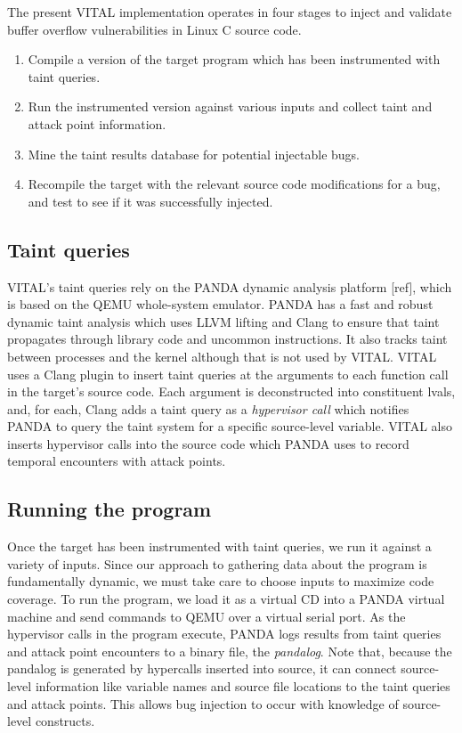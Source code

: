 
The present VITAL implementation operates in four stages to inject and validate buffer overflow vulnerabilities in Linux C source code. 

\begin{enumerate}
\item Compile a version of the target program which has been instrumented with taint queries.
\item Run the instrumented version against various inputs and collect taint and attack point information.
\item Mine the taint results database for potential injectable bugs.
\item Recompile the target with the relevant source code modifications for a bug, and test to see if it was successfully injected.
\end{enumerate}

\subsection{Taint queries}
VITAL's taint queries rely on the PANDA dynamic analysis platform [ref], which is based on the QEMU whole-system emulator.
PANDA has a fast and robust dynamic taint analysis which uses LLVM lifting and Clang to ensure that taint propagates through library code and uncommon instructions.
It also tracks taint between processes and the kernel although that is not used by VITAL.
VITAL uses a Clang plugin to insert taint queries at the arguments to each function call in the target's source code.
Each argument is deconstructed into constituent lvals, and, for each, Clang adds a taint query as a \emph{hypervisor call} which notifies PANDA to query the taint system for a specific source-level variable.
VITAL also inserts hypervisor calls into the source code which PANDA uses to record temporal encounters with attack points.

\subsection{Running the program}
Once the target has been instrumented with taint queries, we run it against a variety of inputs.
Since our approach to gathering data about the program is fundamentally dynamic, we must take care to choose inputs to maximize code coverage.
To run the program, we load it as a virtual CD into a PANDA virtual machine and send commands to QEMU over a virtual serial port.
As the hypervisor calls in the program execute, PANDA logs results from taint queries and attack point encounters to a binary file, the \emph{pandalog}.
Note that, because the pandalog is generated by hypercalls inserted into source, it can connect source-level information like variable names and source file locations to the taint queries and attack points.
This allows bug injection to occur with knowledge of source-level constructs. 


